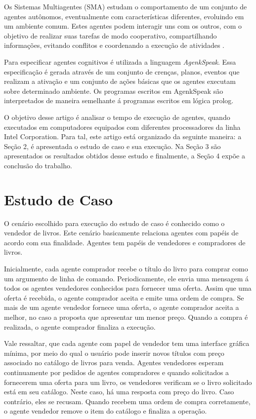 \documentclass[conference]{IEEEtran}
\begin{document}
        Os Sistemas Multiagentes (SMA) estudam o comportamento de um conjunto de agentes autônomos, eventualmente com características diferentes, evoluindo em um ambiente comum. Estes agentes podem interagir uns com os outros, com o objetivo de realizar suas tarefas de modo cooperativo, compartilhando informações, evitando conflitos e coordenando a execução de atividades \cite{alvares1997introduccao}.
        
        Para especificar agentes cognitivos é utilizada a linguagem \textit{AgenkSpeak}. Essa especificação é gerada através de um conjunto de crenças, planos, eventos que realizam a ativação e um conjunto de ações básicas que os agentes executam sobre determinado ambiente. Os programas escritos em AgenkSpeak  são interpretados de maneira semelhante á programas escritos em lógica prolog.      
        
    O objetivo desse artigo é analisar o tempo de execução de agentes, quando executados em computadores equipados com diferentes processadores da linha Intel Corporation. Para tal, este artigo está organizado da seguinte maneira: a Seção 2, é apresentada o estudo de caso e sua execução. Na Seção 3 são apresentados os resultados obtidos desse estudo e finalmente, a Seção 4 expõe a conclusão do trabalho.
      

    \section{Estudo de Caso}
    
    O cenário escolhido para execução do estudo de caso é conhecido como o vendedor de livros. Este cenário basicamente relaciona agentes com papéis de acordo com sua finalidade.  Agentes tem papéis de vendedores e compradores de livros. 
        
    Inicialmente, cada agente comprador recebe o título do livro para comprar como um argumento de linha de comando. Periodicamente, ele envia uma mensagem á todos os agentes vendedores conhecidos para fornecer uma oferta. Assim que uma oferta é recebida, o agente comprador aceita e emite uma ordem de compra. Se mais de um agente vendedor fornece uma oferta, o agente comprador aceita a melhor, no caso a proposta que apresentar um menor preço. Quando a compra é realizada, o agente comprador finaliza a execução.
        
    Vale ressaltar, que cada agente com papel de vendedor tem uma interface gráfica mínima, por meio do qual o usuário pode inserir novos títulos com preço associado no catálogo de livros para venda. Agentes vendedores esperam continuamente por pedidos de agentes compradores e quando solicitados a fornecerem uma oferta para um livro, os vendedores verificam se o livro solicitado está em seu catálogo. Neste caso, há uma resposta com preço do livro. Caso contrário, eles se recusam. Quando recebem uma ordem de compra corretamente, o agente vendedor remove o item do catálogo e finaliza a operação.
    
\end{document}
